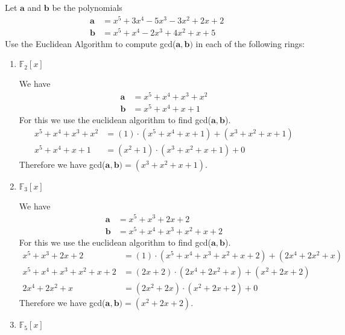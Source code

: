 \documentclass[a4paper, 11pt]{article}
\begin{document}
    Let $\bm{a}$ and $\bm{b}$ be the polynomials
    \begin{align*}
        \bm{a} &= x^5 + 3x^4 - 5x^3 - 3x^2 + 2x + 2\\
        \bm{b} &= x^5 + x^4 - 2x^3 +4x^2 + x + 5
    \end{align*}
    Use the Euclidean Algorithm to compute gcd($\bm{a},\bm{b})$ in each of the following rings:
    \begin{enumerate}[label=(\alph*)]
        \item $\mathbb{F}_2[x]$
        
        We have
        \begin{align*}
            \bm{a} &= x^5 + x^4 + x^3 + x^2 \\
            \bm{b} &= x^5 + x^4 + x + 1
        \end{align*}
        For this we use the euclidean algorithm to find gcd($\bm{a},\bm{b}$).
        \begin{align*}
            x^5 + x^4 + x^3 + x^2 &= (1)\cdot(x^5 + x^4 + x + 1) + (x^3 + x^2 + x + 1)\\
            x^5 + x^4 + x + 1 &= (x^2 + 1)\cdot(x^3 + x^2 + x + 1) + 0
        \end{align*}
        Therefore we have gcd($\bm{a},\bm{b})=(x^3 + x^2 + x + 1)$.
        
        \item $\mathbb{F}_3[x]$
        
        We have
        \begin{align*}
            \bm{a} &= x^5 + x^3 + 2x + 2\\
            \bm{b} &= x^5 + x^4 + x^3 + x^2 + x + 2
        \end{align*}
        For this we use the euclidean algorithm to find gcd($\bm{a},\bm{b}$).
        \begin{align*}
            x^5 + x^3 + 2x + 2 &= (1)\cdot(x^5 + x^4 + x^3 + x^2 + x + 2) + (2x^4 + 2x^2 + x)\\
            x^5 + x^4 + x^3 + x^2 + x + 2 &= (2x+2)\cdot(2x^4 + 2x^2 + x) + (x^2+2x+2)\\
            2x^4 + 2x^2 + x &= (2x^2+2x)\cdot(x^2+2x+2) + 0
        \end{align*}
        Therefore we have gcd($\bm{a},\bm{b})=(x^2+2x+2)$.
        
        \item $\mathbb{F}_5[x]$
        

\end{enumerate}
\end{document}
